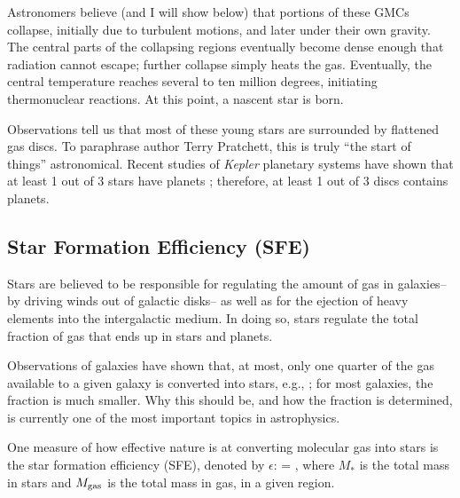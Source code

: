 \documentclass[../dissertation.tex]{subfiles}
\begin{document}
Astronomers believe (and I will show below) that portions of these
GMCs collapse, initially due to turbulent motions, and later under
their own gravity.  The central parts of the collapsing regions
eventually become dense enough that radiation cannot escape; further
collapse simply heats the gas.  Eventually, the central temperature reaches
several to ten million degrees, initiating thermonuclear reactions.
At this point, a nascent star is born.

Observations tell us that most of these young stars are surrounded by flattened gas discs. 
To paraphrase author Terry Pratchett, this is truly ``the start of things'' astronomical. 
Recent studies of {\it Kepler} planetary systems have shown that at least 1 out of 3 stars have planets \citep{2018arXiv180209526Z}; 
therefore, at least 1 out of 3 discs contains planets. 


\subsection{Star Formation Efficiency (SFE)}
Stars are believed to be responsible for regulating the amount of gas in galaxies--by driving winds out of galactic disks-- as well as for the ejection of heavy elements into the intergalactic
medium. In doing so, stars regulate the total fraction of gas that ends up in stars and planets. 
 
Observations of galaxies have shown that, at most, only one quarter of the gas available to a given galaxy is converted into stars, e.g., \citet{2010ApJ...708L..14M}; for most galaxies, the fraction is much smaller. 
Why this should be, and how the fraction is determined, is currently one of the most important topics in astrophysics.

One measure of how effective nature is at converting molecular gas into stars is the star formation efficiency (SFE), denoted by $\epsilon$:
%
\be
\epsilon = ,
\ee
%
where $M_*$ is the total mass in stars and $M_{\rm gas}$ is the total mass in gas, in a given region.
\end{document}
